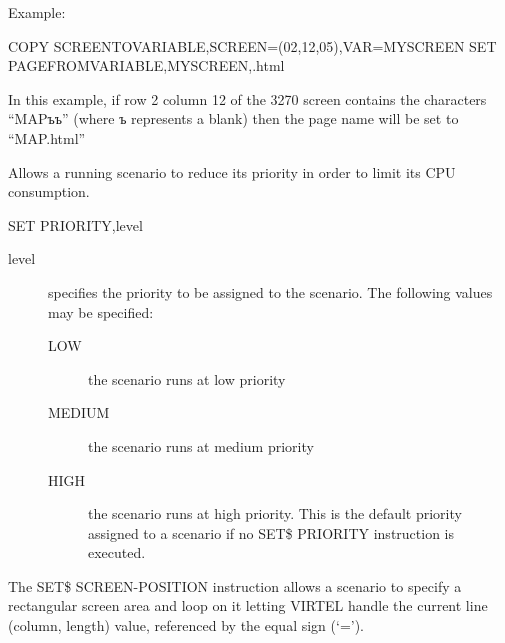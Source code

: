 \documentclass[letterpaper,10pt,english]{sphinxmanual}
\begin{document}
Example:

\begin{sphinxVerbatim}[commandchars=\\\{\}]
COPY\PYGZdl{} SCREEN\PYGZhy{}TO\PYGZhy{}VARIABLE,SCREEN=(02,12,05),VAR=\PYGZsq{}MYSCREEN\PYGZsq{}
SET\PYGZdl{} PAGE\PYGZhy{}FROM\PYGZhy{}VARIABLE,\PYGZsq{}MYSCREEN\PYGZsq{},\PYGZsq{}.html\PYGZsq{}
\end{sphinxVerbatim}

In this example, if row 2 column 12 of the 3270 screen contains the characters “MAPъъ” (where ъ represents a blank) then the page name will be set to “MAP.html”


Allows a running scenario to reduce its priority in order to limit its CPU consumption.

\begin{sphinxVerbatim}[commandchars=\\\{\}]
SET\PYGZdl{} PRIORITY,level
\end{sphinxVerbatim}
\begin{description}
\item[{level}] \leavevmode
specifies the priority to be assigned to the scenario. The following values may be specified:
\begin{description}
\item[{LOW}] \leavevmode
the scenario runs at low priority

\item[{MEDIUM}] \leavevmode
the scenario runs at medium priority

\item[{HIGH}] \leavevmode
the scenario runs at high priority. This is the default priority assigned to a scenario if no SET\$ PRIORITY instruction is executed.

\end{description}

\end{description}
\label{\detokenize{User_Guide:v457ug-set-screen-position}}

The SET\$ SCREEN-POSITION instruction allows a scenario to specify a rectangular screen area and loop on it letting VIRTEL handle the current line (column, length) value, referenced by the equal sign (‘=’).
\end{document}
